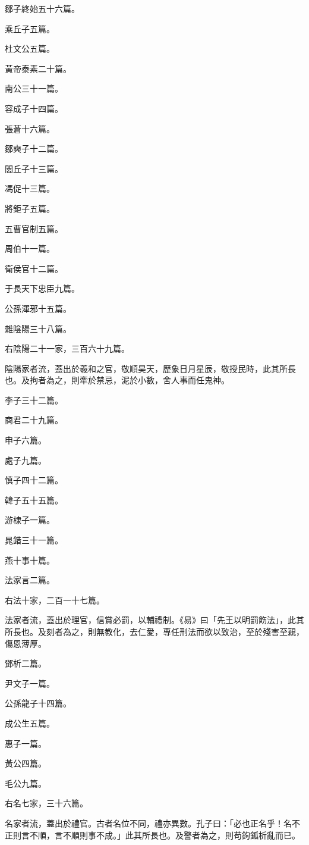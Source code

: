 \begin{pinyinscope}
鄒子終始五十六篇。

乘丘子五篇。

杜文公五篇。

黃帝泰素二十篇。

南公三十一篇。

容成子十四篇。

張蒼十六篇。

鄒奭子十二篇。

閭丘子十三篇。

馮促十三篇。

將鉅子五篇。

五曹官制五篇。

周伯十一篇。

衛侯官十二篇。

于長天下忠臣九篇。

公孫渾邪十五篇。

雜陰陽三十八篇。

右陰陽二十一家，三百六十九篇。

陰陽家者流，蓋出於羲和之官，敬順昊天，歷象日月星辰，敬授民時，此其所長也。及拘者為之，則牽於禁忌，泥於小數，舍人事而任鬼神。

李子三十二篇。

商君二十九篇。

申子六篇。

處子九篇。

慎子四十二篇。

韓子五十五篇。

游棣子一篇。

晁錯三十一篇。

燕十事十篇。

法家言二篇。

右法十家，二百一十七篇。

法家者流，蓋出於理官，信賞必罰，以輔禮制。《易》曰「先王以明罰飭法」，此其所長也。及刻者為之，則無教化，去仁愛，專任刑法而欲以致治，至於殘害至親，傷恩薄厚。

鄧析二篇。

尹文子一篇。

公孫龍子十四篇。

成公生五篇。

惠子一篇。

黃公四篇。

毛公九篇。

右名七家，三十六篇。

名家者流，蓋出於禮官。古者名位不同，禮亦異數。孔子曰：「必也正名乎！名不正則言不順，言不順則事不成。」此其所長也。及譥者為之，則苟鉤鈲析亂而已。


\end{pinyinscope}
